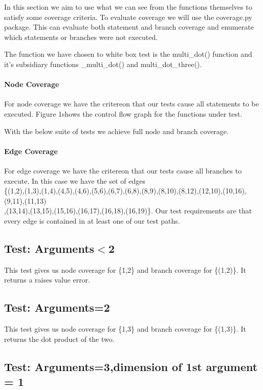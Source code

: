 In this section we aim to use what we can see from the functions themselves to satisfy some coverage
criteria. To evaluate coverage we will use the coverage.py package. This can evaluate both statement and branch coverage and enumerate which statements or branches were not executed.

The function we have chosen to white box test is the multi\_dot() function and it's subsidiary functions \_multi\_dot() and multi\_dot\_three().

\paragraph{Node Coverage}


For node coverage we have the critereon that our tests cause all statements to be executed. Figure 1shows the control flow graph for the functions under test. 


With the below suite of tests we achieve full node and branch coverage.

\paragraph{Edge Coverage}

For edge coverage we have the critereon that our tests cause all branches to execute. In this case we have the set of edges \\
\{(1,2),(1,3),(1,4),(4,5),(4,6),(5,6),(6,7),(6,8),(8,9),(8,10),(8,12),(12,10),(10,16),(9,11),(11,13)\\
,(13,14),(13,15),(15,16),(16,17),(16,18),(16,19)\}.
Our test requirements are that every edge is contained in at least one of our test paths.

\subsection{Test: Arguments$<$2}

This test gives us node coverage for \{1,2\} and branch coverage for \{(1,2)\}. It returns a raises value error.

\subsection{Test: Arguments=2}

This test gives us node coverage for \{1,3\} and branch coverage for \{(1,3)\}. It returns the dot product of the two.


\subsection{Test: Arguments=3,dimension of 1st argument = 1}

